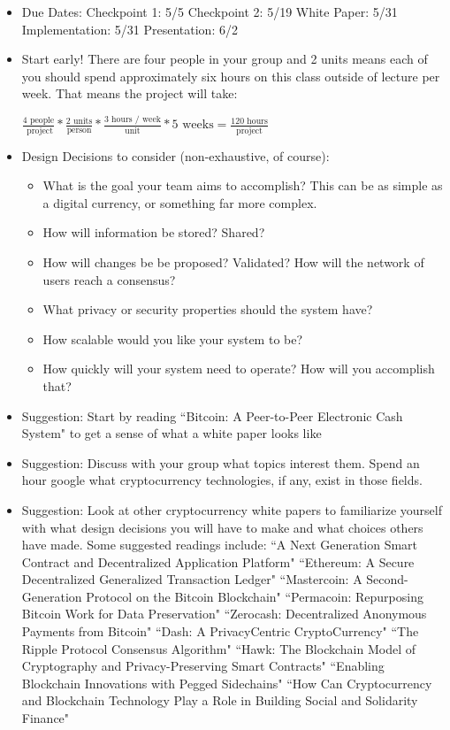 \documentclass{article}
\begin{document}
\begin{itemize}
\item Due Dates:
\subitem Checkpoint 1: 5/5
\subitem Checkpoint 2: 5/19
\subitem White Paper: 5/31
\subitem Implementation: 5/31
\subitem Presentation: 6/2

\item Start early! There are four people in your group and 2 units means each of you should spend approximately six hours on this class outside of lecture per week. That means the project will take:

$\frac{4 \text{ people}}{\text{ project}} * \frac{2 \text{ units}}{\text{person}} * \frac{3 \text{ hours / week}}{\text{unit}} * 5 \text{ weeks} = \frac{120 \text{ hours}}{\text{project}}$

\item Design Decisions to consider (non-exhaustive, of course):
\begin{itemize}
\item What is the goal your team aims to accomplish? This can be as simple as a digital currency, or something far more complex.
\item How will information be stored? Shared?
\item How will changes be be proposed? Validated? How will the network of users reach a consensus?
\item What privacy or security properties should the system have?
\item How scalable would you like your system to be?
\item How quickly will your system need to operate? How will you accomplish that?
\end{itemize}

\item Suggestion: Start by reading ``Bitcoin: A Peer-to-Peer Electronic Cash System" to get a sense of what a white paper looks like

\item Suggestion: Discuss with your group what topics interest them. Spend an hour google what cryptocurrency technologies, if any, exist in those fields.

\item Suggestion: Look at other cryptocurrency white papers to familiarize yourself with what design decisions you will have to make and what choices others have made. Some suggested readings include:
\subitem ``A Next Generation Smart Contract and Decentralized Application Platform"
\subitem ``Ethereum: A Secure Decentralized Generalized Transaction Ledger"
\subitem ``Mastercoin: A Second-Generation Protocol on the Bitcoin Blockchain"
\subitem ``Permacoin: Repurposing Bitcoin Work for Data Preservation"
\subitem ``Zerocash: Decentralized Anonymous Payments from Bitcoin"
\subitem ``Dash: A Privacy­Centric Crypto­Currency"
\subitem ``The Ripple Protocol Consensus Algorithm"
\subitem ``Hawk: The Blockchain Model of Cryptography and
Privacy-Preserving Smart Contracts"
\subitem ``Enabling Blockchain Innovations with Pegged Sidechains"
\subitem ``How Can Cryptocurrency and Blockchain Technology Play a Role in Building Social and Solidarity Finance"
\end{itemize}
\end{document}

